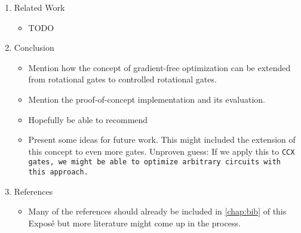 \begin{enumerate}
    \item Related Work
    \begin{itemize}
        \item TODO
    \end{itemize}

    \item Conclusion
    \begin{itemize}
        \item
            Mention how the concept of gradient-free optimization can be
            extended from rotational gates to controlled rotational gates.
        \item
            Mention the proof-of-concept implementation and its evaluation.
        \item
            Hopefully be able to recommend 
        \item
            Present some ideas for future work.
            This might included the extension of this concept to even more
            gates.
            Unproven guess:
            If we apply this to \tt{CCX} gates, we might be able to optimize
            arbitrary circuits with this approach.
    \end{itemize}

    \item References
    \begin{itemize}
        \item
            Many of the references should already be included in
            \autoref{chap:bib} of this Exposé but more literature might
            come up in the process. 
    \end{itemize}
\end{enumerate}
